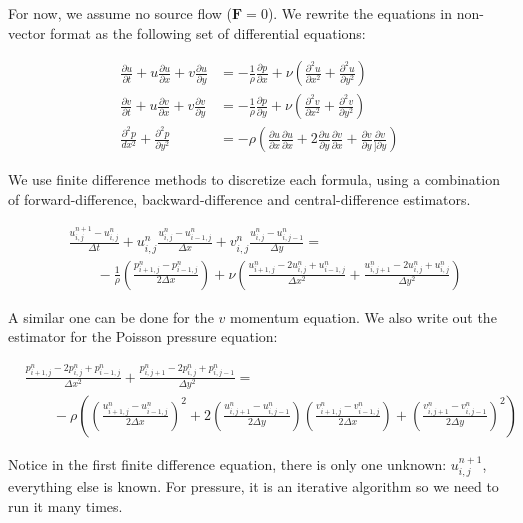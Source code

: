 \documentclass[12pt]{article}
\begin{document}
For now, we assume no source flow ($\mathbf{F} = 0$).
We rewrite the equations in non-vector format as the following set of differential equations:

\begin{align}
    \frac{\partial u}{\partial t} + u\frac{\partial u}{\partial x} + v\frac{\partial u}{\partial y} &= -\frac{1}{\rho} \frac{\partial p}{\partial x} + \nu(\frac{\partial^2 u}{\partial x^2} + \frac{\partial^2 u}{\partial y^2}) \\
    \frac{\partial v}{\partial t} + u\frac{\partial v}{\partial x} + v\frac{\partial v}{\partial y} &= -\frac{1}{\rho} \frac{\partial p}{\partial y} + \nu(\frac{\partial^2 v}{\partial x^2} + \frac{\partial^2 v}{\partial y^2}) \\
    \frac{\partial^2 p}{dx^2} + \frac{\partial^2 p}{\partial y^2} &= -\rho(\frac{\partial u}{\partial x}\frac{\partial u}{\partial x} + 2\frac{\partial u}{\partial y}\frac{\partial v}{\partial x} + \frac{\partial v}{\partial y}\frac{\partial v}{]\partial y})
\end{align}

We use finite difference methods to discretize each formula, using a combination of forward-difference, backward-difference and central-difference estimators.

\begin{align}
    &\frac{u_{i,j}^{n+1} - u_{i,j}^n}{\Delta t} + u_{i,j}^n\frac{u_{i,j}^n - u_{i-1,j}^n}{\Delta x} + v_{i,j}^n\frac{u_{i,j}^n - u_{i,j-1}^n}{\Delta y} = \\ &\qquad -\frac{1}{\rho}(\frac{p_{i+1,j}^n - p_{i-1,j}^n}{2\Delta x}) + \nu(\frac{u_{i+1,j}^n - 2u_{i,j}^n + u_{i-1,j}^n}{\Delta x^2} + \frac{u_{i,j+1}^n - 2u_{i,j}^n + u_{i,j}^n}{\Delta y^2})
\end{align}

A similar one can be done for the $v$ momentum equation. We also write out the estimator for the Poisson pressure equation:

\begin{align}
    &\frac{p_{i+1,j}^n - 2p_{i,j}^n + p_{i-1,j}^n}{\Delta x^2} + \frac{p_{i,j+1}^n - 2p_{i,j}^n + p_{i,j-1}^n}{\Delta y^2} = \\
    &\qquad -\rho((\frac{u_{i+1,j}^n - u_{i-1,j}^n}{2\Delta x})^2 + 2(\frac{u_{i,j+1}^n - u_{i,j-1}^n}{2\Delta y})(\frac{v_{i+1,j}^n - v_{i-1,j}^n}{2\Delta x}) + (\frac{v_{i,j+1}^n - v_{i,j-1}^n}{2\Delta y})^2)
\end{align}

Notice in the first finite difference equation, there is only one unknown: $u_{i,j}^{n+1}$, everything else is known. For pressure, it is an iterative algorithm so we need to run it many times.
\end{document}
